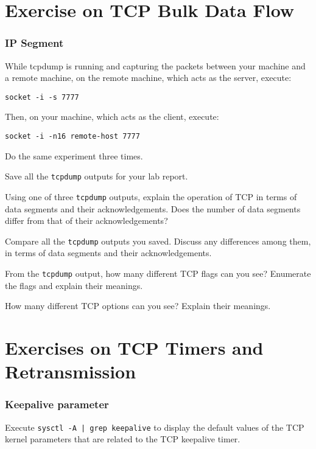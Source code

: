 \documentclass{../UTNetLab}
\begin{document}
\part{Exercise on TCP Bulk Data Flow}
\section{IP Segment}
    While tcpdump is running and capturing the packets between your machine and a remote machine, on the remote machine, which acts as the server, execute:
    \begin{lstlisting}
socket -i -s 7777
    \end{lstlisting}
    Then, on your machine, which acts as the client, execute:
    \begin{lstlisting}[emph={your-host, remote-host}]
socket -i -n16 remote-host 7777
    \end{lstlisting}
    Do the same experiment three times.

    {Save} all the \lstinline{tcpdump} outputs for your lab report.
    
    \begin{report}
    \item Using one of three \lstinline{tcpdump} outputs, explain the operation of TCP in terms of data segments and their acknowledgements. Does the number of data segments differ from that of their acknowledgements?

    Compare all the \lstinline{tcpdump} outputs you saved.
    Discuss any differences among them, in terms of data segments and their acknowledgements.
    
    \item From the \lstinline{tcpdump} output, how many different TCP flags can you see? Enumerate the flags and explain their meanings.

    How many different TCP options can you see?
    Explain their meanings.
    \end{report}

\part{Exercises on TCP Timers and Retransmission}
\section{Keepalive parameter}
    Execute \lstinline{sysctl -A | grep keepalive} to display the default values of the TCP kernel parameters that are related to the TCP keepalive timer.
\end{document}
